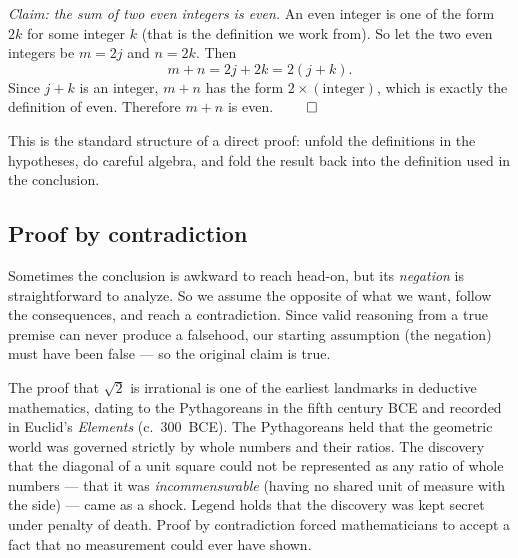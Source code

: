 \begin{example}
\label{ch40:ex-direct}
\emph{Claim: the sum of two even integers is even.} An even integer is one of the
form $2k$ for some integer $k$ (that is the definition we work from). So let the
two even integers be $m = 2j$ and $n = 2k$. Then
\[
  m + n = 2j + 2k = 2(j+k).
\]
Since $j+k$ is an integer, $m+n$ has the form $2 \times (\text{integer})$, which is
exactly the definition of even. Therefore $m+n$ is even. $\qed$

This is the standard structure of a direct proof: unfold the definitions in the
hypotheses, do careful algebra, and fold the result back into the definition used
in the conclusion.
\end{example}

\subsection{Proof by contradiction}

Sometimes the conclusion is awkward to reach head-on, but its \emph{negation} is
straightforward to analyze. So we assume the opposite of what we want, follow the
consequences, and reach a contradiction. Since valid reasoning from a true
premise can never produce a falsehood, our starting assumption (the negation) must
have been false --- so the original claim is true.

\begin{connectionbox}
The proof that $\sqrt 2$ is irrational is one of the earliest landmarks in deductive mathematics,
dating to the Pythagoreans in the fifth century BCE and recorded in Euclid's
\emph{Elements} (c.~300~BCE). The Pythagoreans held that
the geometric world was governed strictly by whole numbers and their ratios. The discovery that
the diagonal of a unit square could not be represented as any ratio of whole numbers ---
that it was \emph{incommensurable} (having no shared unit of measure with the side) ---
came as a shock. Legend holds that the discovery was kept secret under
penalty of death. Proof by contradiction forced
mathematicians to accept a fact that no measurement could ever have shown.
\end{connectionbox}


